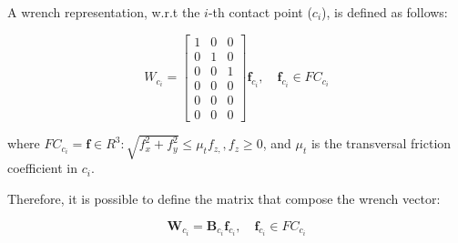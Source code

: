 \begin{figure}[h!]
\end{figure}

A wrench representation, w.r.t the $i$-th contact point ($c_i$), is defined as follows:

\begin{equation}
W_{c_i}=\begin{bmatrix}
1 & 0 & 0 \\ 
0 & 1 & 0 \\ 
0 & 0 & 1 \\ 
0 & 0 & 0 \\ 
0 & 0 & 0 \\ 
0 & 0 & 0 
\end{bmatrix} \mathbf{f}_{c_i}, \quad \mathbf{f}_{c_i} \in F C_{c_i}
\end{equation}

\noindent
where $F C_{c_i}=\mathbf{f} \in \!R^3: \sqrt{f_{x}^{2}+f_{y}^{2}} \leq \mu_{t} f_{z,}, f_{z} \geq 0$, and $\mu_t$ is the transversal friction coefficient in $c_i$. 

Therefore, it is possible to define the matrix that compose the wrench vector:

\begin{equation}
\mathbf{W}_{c_i}=\mathbf{B}_{c_i} \mathbf{f}_{c_i}, \quad \mathbf{f}_{c_i} \in F C_{c_i}
\end{equation}

